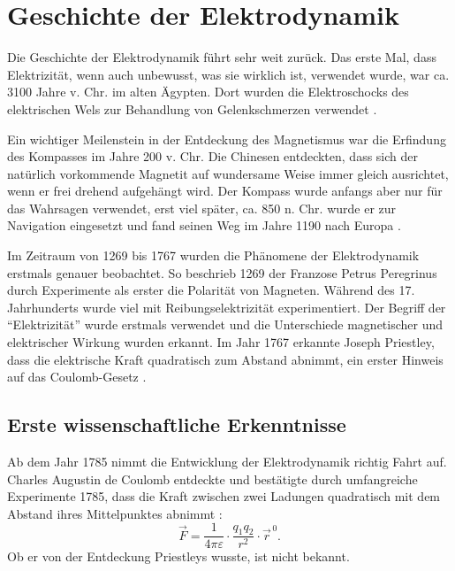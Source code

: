 %
%
%
\section{Geschichte der Elektrodynamik\label{maxwell:section:teil0}}

Die Geschichte der Elektrodynamik führt sehr weit zurück.
Das erste Mal, dass Elektrizität, wenn auch unbewusst, was sie wirklich ist, verwendet wurde, war ca. 3100 Jahre v. Chr. im alten Ägypten.
Dort wurden die Elektroschocks des elektrischen Wels zur Behandlung von Gelenkschmerzen verwendet \cite{maxwell:History_of_bioelectricity}.

Ein wichtiger Meilenstein in der Entdeckung des Magnetismus war die Erfindung des Kompasses im Jahre 200 v. Chr.
Die Chinesen entdeckten, dass sich der natürlich vorkommende Magnetit auf wundersame Weise immer gleich ausrichtet, wenn er frei drehend aufgehängt wird.
Der Kompass wurde anfangs aber nur für das Wahrsagen verwendet, erst viel später, ca. 850 n. Chr. wurde er zur Navigation eingesetzt und fand seinen Weg im Jahre 1190 nach Europa \cite{maxwell:History_of_the_compass}.

Im Zeitraum von 1269 bis 1767 wurden die Phänomene der Elektrodynamik erstmals genauer beobachtet.
So beschrieb 1269 der Franzose Petrus Peregrinus durch Experimente als erster die Polarität von Magneten.
Während des 17. Jahrhunderts wurde viel mit Reibungselektrizität experimentiert. Der Begriff der ``Elektrizität'' wurde erstmals verwendet und die Unterschiede magnetischer und elektrischer Wirkung wurden erkannt.
Im Jahr 1767 erkannte Joseph Priestley, dass die elektrische Kraft quadratisch zum Abstand abnimmt, ein erster Hinweis auf das Coulomb-Gesetz \cite{maxwell:History_of_electromagnetic_theory}.

\subsection{Erste wissenschaftliche Erkenntnisse}
Ab dem Jahr 1785 nimmt die Entwicklung der Elektrodynamik richtig Fahrt auf.
Charles Augustin de Coulomb entdeckte und bestätigte durch umfangreiche Experimente 1785, dass die Kraft zwischen zwei Ladungen quadratisch mit dem Abstand ihres Mittelpunktes abnimmt \cite{maxwell:Charles-Augustin_de_Coulomb}:
\[
\vec{F}
=
\frac{1}{4 \pi \varepsilon}
\cdot
\frac{q_1 q_2}{r^2}
\cdot
\vec{r}^{\,0}.
\]
Ob er von der Entdeckung Priestleys wusste, ist nicht bekannt.

